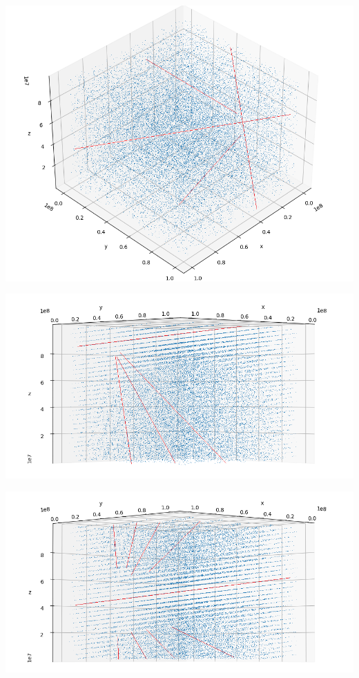 \documentclass[showpacs, oneside, onecolumn, prl, amsmath, amssymb, nofootinbib, superscriptaddress, notitlepage]{revtex4-1}
\begin{document}
	{\begin{minipage}[b]{0.39\textwidth}
	\includegraphics[scale=0.4]{6-1-5.png}
	\end{minipage}}
	\subfigure
	{\begin{minipage}[b]{0.39\textwidth}
	\includegraphics[scale=0.4]{6-1-6.png}
	\end{minipage}}
	\subfigure
	{\begin{minipage}[b]{0.39\textwidth}
	\includegraphics[scale=0.4]{6-1-7.png}
	\end{minipage}}
\end{document}
